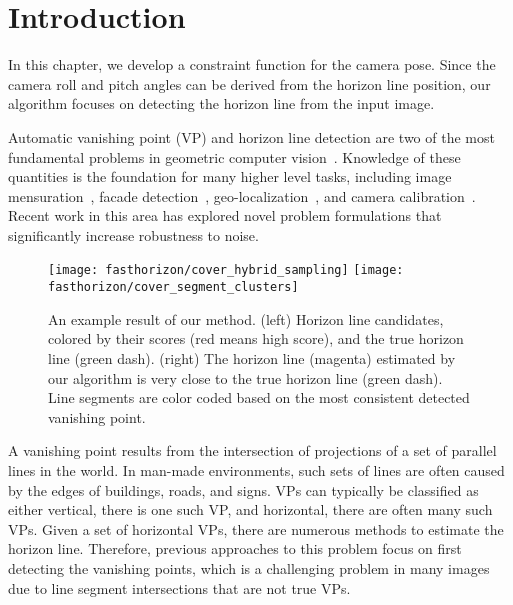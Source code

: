 \section{Introduction}

In this chapter, we develop a constraint function for the
camera pose. Since the camera roll and pitch angles can be derived from
the horizon line position, our algorithm focuses on detecting the
horizon line from the input image.

Automatic vanishing point (VP) and horizon line detection are two of
the most fundamental problems in geometric computer
vision~\cite{barnard1983interpreting,magee1984determining}. Knowledge
of these quantities is the foundation for many higher level
tasks, including image mensuration~\cite{criminisi2000single},
facade detection~\cite{liulocal2014},
geo-localization~\cite{baatz2010handling,workman2014rainbow}, and
camera
calibration~\cite{autorecovery2000,grammatikopoulos2007automatic,
jacobs13cloudcalibration,videocampass2002}. Recent work in this area
\cite{global2013,wildenauer2012,kitware2013} has explored novel
problem formulations that significantly increase robustness to noise.

\begin{figure}
  \centering
  \texttt{[image: fasthorizon/cover\_hybrid\_sampling]}
  \hfill
  \texttt{[image: fasthorizon/cover\_segment\_clusters]}

  \caption{An example result of our method. (left) Horizon line
    candidates, colored by their scores (red means high score), and
    the true horizon line (green dash). (right) The horizon line
    (magenta) estimated by our algorithm is very close to the true
    horizon line (green dash).  Line segments are color coded based on
    the most consistent detected vanishing point.}

  \label{fig:cover}
\end{figure}

A vanishing point results from the intersection of projections of a
set of parallel lines in the world. In man-made environments, such
sets of lines are often caused by the edges of buildings, roads, and
signs. VPs can typically be classified as either vertical, there is
one such VP, and horizontal, there are often many such VPs.  Given a
set of horizontal VPs, there are numerous methods to estimate the
horizon line.  Therefore, previous approaches to this problem focus on
first detecting the vanishing points, which is a challenging problem
in many images due to line segment intersections that are not true
VPs.

